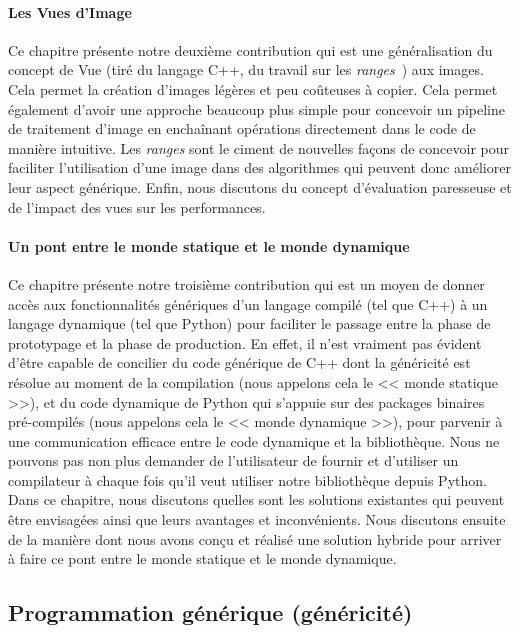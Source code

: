 \paragraph{Les Vues d'Image} Ce chapitre présente notre deuxième contribution qui est une généralisation du concept de
Vue (tiré du langage C++, du travail sur les \emph{ranges}~\parencite{niebler.2018.ranges}) aux images. Cela permet la
création d'images légères et peu coûteuses à copier. Cela permet également d'avoir une approche beaucoup plus simple
pour concevoir un pipeline de traitement d'image en enchaînant opérations directement dans le code de manière intuitive.
Les \emph{ranges} sont le ciment de nouvelles façons de concevoir pour faciliter l'utilisation d'une image dans des
algorithmes qui peuvent donc améliorer leur aspect générique. Enfin, nous discutons du concept d'évaluation paresseuse
et de l'impact des vues sur les performances.

\paragraph{Un pont entre le monde statique et le monde dynamique} Ce chapitre présente notre troisième contribution qui
est un moyen de donner accès aux fonctionnalités génériques d'un langage compilé (tel que C++) à un langage dynamique
(tel que Python) pour faciliter le passage entre la phase de prototypage et la phase de production. En effet, il n'est
vraiment pas évident d'être capable de concilier du code générique de C++ dont la généricité est résolue au moment de la
compilation (nous appelons cela le << monde statique >>), et du code dynamique de Python qui s'appuie sur des packages
binaires pré-compilés (nous appelons cela le << monde dynamique >>), pour parvenir à une communication efficace entre le
code dynamique et la bibliothèque. Nous ne pouvons pas non plus demander de l'utilisateur de fournir et d'utiliser un
compilateur à chaque fois qu'il veut utiliser notre bibliothèque depuis Python. Dans ce chapitre, nous discutons quelles
sont les solutions existantes qui peuvent être envisagées ainsi que leurs avantages et inconvénients. Nous discutons
ensuite de la manière dont nous avons conçu et réalisé une solution hybride pour arriver à faire ce pont entre le monde
statique et le monde dynamique.


\subsection*{Programmation générique (généricité)}


